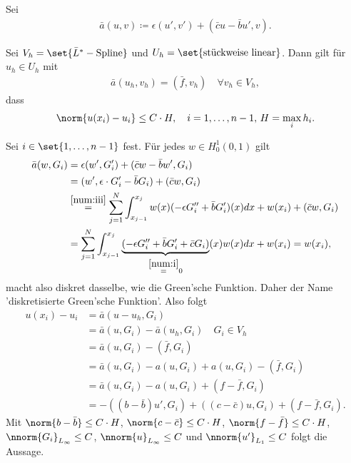 Sei
\begin{align*}
  \bar a (u, v)\coloneqq \epsilon (u', v') + (\bar c u - \bar b u', v). 
\end{align*}
\begin{satz}\label{thm:6-3}
  Sei $V_{h} = \set{\bar L^{*} - \text{Spline}}$ und $U_{h} = \set{\text{stückweise linear}}$. 
  Dann gilt für $u_{h} \in U_{h}$ mit
  \begin{align*}
    \bar a(u_{h}, v_{h}) = (\bar f, v_{h})\quad \forall v_{h} \in V_{h}, 
  \end{align*}
  dass
  \begin{align*}
    \norm{u(x_{i}) - u_{i}} \leq C\cdot H, \quad i = 1, \dots, n-1, \, H = \max_{i} h_{i}. 
  \end{align*}
\end{satz}
\begin{beweis}
  Sei $i \in \set{1, \dots, n-1}$ fest. Für jedes $w \in H_{0}^{1}(0, 1)$ gilt
  \begin{align*}
    \bar a(w, G_{i}) &= \epsilon (w', G_{i}') + (\bar c w - \bar b w', G_{i})\\
    &= (w', \epsilon\cdot  G_{i}' - \bar b G_{i}) + (\bar c w, G_{i})\\
    &\stackrel{\ref{num:iii}} = \sum_{j = 1}^{N} \int_{x_{j-1}}^{x_{j}} w(x) (-\epsilon G_{i}'' + \bar b G_{i}')(x) dx + w(x_{i}) + (\bar c w, G_{i})\\
    & = \sum_{j = 1}^{N} \int_{x_{j-1}}^{x_{j}}  \underbrace{(-\epsilon G_{i}'' + \bar b G_{i}' + \bar c G_{i})}_{\stackrel{\ref{num:i}}= 0}(x)  w(x)dx + w(x_{i})  = w(x_{i}), 
  \end{align*}
  macht also diskret dasselbe, wie die Green'sche Funktion. Daher der Name 'diskretisierte Green'sche Funktion'. Also folgt
  \begin{align*}
    u(x_{i}) - u_{i} &= \bar a (u - u_{h}, G_{i})\\
    &= \bar a (u, G_{i}) -\bar a (u_{h}, G_{i}) \quad G_{i} \in V_{h}\\
    &= \bar a (u, G_{i}) - (\bar f , G_{i}) \\
    &= \bar a (u, G_{i}) - a(u , G_{i}) + a(u , G_{i})  - (\bar f, G_{i})\\
    &= \bar a (u, G_{i}) - a(u , G_{i}) +( f - \bar f, G_{i})\\
    &= - ((b - \bar b)u', G_{i}) + ((c-\bar c) u, G_{i}) + ( f - \bar f, G_{i}). 
  \end{align*}
  Mit $\norm{b - \bar b} \leq C\cdot H$, $\norm{c - \bar c} \leq C\cdot H$, $\norm{f - \bar f} \leq C\cdot H$, $\nnorm{G_{i}}_{L_{\infty}}\leq C$, $\nnorm{u}_{L_{\infty}}\leq C$ und $\nnorm{u'}_{L_{1}}\leq C$ folgt die Aussage. 
\end{beweis}
